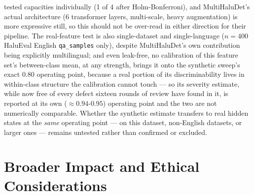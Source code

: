 \documentclass[10pt]{article} %
\begin{document}
tested capacities individually (1 of 4 after Holm-Bonferroni), and
MultiHaluDet's actual architecture (6 transformer layers, multi-scale, heavy
augmentation) is more expressive still, so this should not be over-read in
either direction for their pipeline. The real-feature test is also
single-dataset and single-language ($n=400$ HaluEval English
\texttt{qa\_samples} only), despite MultiHaluDet's own contribution being
explicitly multilingual; and even leak-free, no calibration of this feature
set's between-class mean, at any strength, brings it onto the synthetic sweep's
exact $0.80$ operating point, because a real portion of its discriminability
lives in within-class structure the calibration cannot touch --- so its
severity estimate, while now free of every defect sixteen rounds of review
have found in it, is reported at its own
($\approx0.94$-$0.95$) operating point and the two are not numerically
comparable. Whether the synthetic estimate transfers to real hidden states at
the \emph{same} operating point --- on this dataset, non-English datasets, or
larger ones --- remains untested rather than confirmed or excluded.

\section{Broader Impact and Ethical Considerations}
\label{sec:impact}
\end{document}

